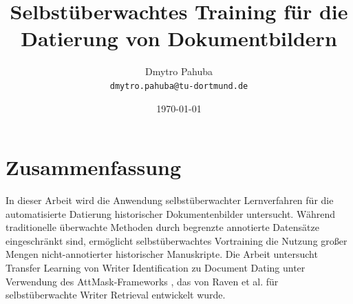 \documentclass[12pt,a4paper]{article}
\title{\textbf{Selbstüberwachtes Training für die Datierung von Dokumentbildern}}
\author{Dmytro Pahuba\\
\texttt{dmytro.pahuba@tu-dortmund.de}}
\date{\germandate\today}
\begin{document}
\maketitle

\section*{\centering Zusammenfassung}

In dieser Arbeit wird die Anwendung selbstüberwachter Lernverfahren für die automatisierte Datierung historischer Dokumentenbilder untersucht. Während traditionelle überwachte Methoden durch begrenzte annotierte Datensätze eingeschränkt sind, ermöglicht selbstüberwachtes Vortraining die Nutzung großer Mengen nicht-annotierter historischer Manuskripte. Die Arbeit untersucht Transfer Learning von Writer Identification zu Document Dating unter Verwendung des AttMask-Frameworks \cite{raven2024}, das von Raven et al. für selbstüberwachte Writer Retrieval entwickelt wurde.
\end{document}

